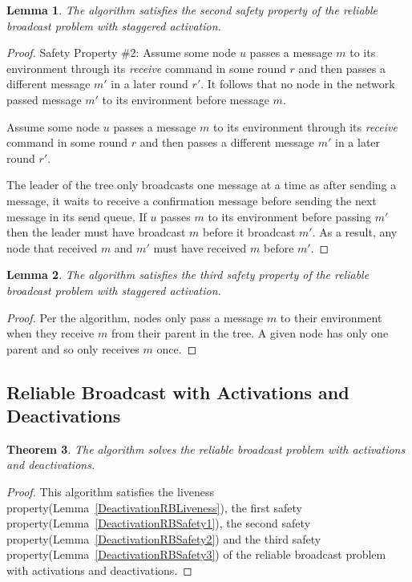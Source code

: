 \documentclass[english]{article}
\newtheorem{theorem}{Theorem}[section]
\newtheorem{lemma}[theorem]{Lemma}
\begin{document}
\begin{lemma}
\label{StaggeredRBSafety2}
The algorithm satisfies the second safety property of the reliable broadcast problem with staggered activation.
\end{lemma}
\begin{proof}
Safety Property \#2: Assume some node $u$ passes a message $m$ to its environment through its \textit{receive} command in some round $r$ and then passes a different message $m'$ in a later round $r'$. It follows that no node in the network passed message $m'$ to its environment before message $m$. 

Assume some node $u$ passes a message $m$ to its environment through its \textit{receive} command in some round $r$ and then passes a different message $m'$ in a later round $r'$. 

The leader of the tree only broadcasts one message at a time as after sending a message, it waits to receive a confirmation message before sending the next message in its send queue. If $u$ passes $m$ to its environment before passing $m'$ then the leader must have broadcast $m$ before it broadcast $m'$. As a result, any node that received $m$ and $m'$ must have received $m$ before $m'$.

\end{proof}

\begin{lemma}
\label{StaggeredRBSafety3}
The algorithm satisfies the third safety property of the reliable broadcast problem with staggered activation.
\end{lemma}
\begin{proof}

Per the algorithm, nodes only pass a message $m$ to their environment when they receive $m$ from their parent in the tree. A given node has only one parent and so only receives $m$ once.

\end{proof}



\subsection {Reliable Broadcast with Activations and Deactivations}

\begin{theorem}
\label{DeactivationReliableBroadcast}
The algorithm solves the reliable broadcast problem with activations and deactivations.
\end{theorem}
\begin{proof}
This algorithm satisfies the liveness property(Lemma~\ref{DeactivationRBLiveness}), 
the first safety property(Lemma~\ref{DeactivationRBSafety1}),
the second safety property(Lemma~\ref{DeactivationRBSafety2}) and 
the third safety property(Lemma~\ref{DeactivationRBSafety3}) of the reliable broadcast problem with activations and deactivations.
\end{proof}
\end{document}
